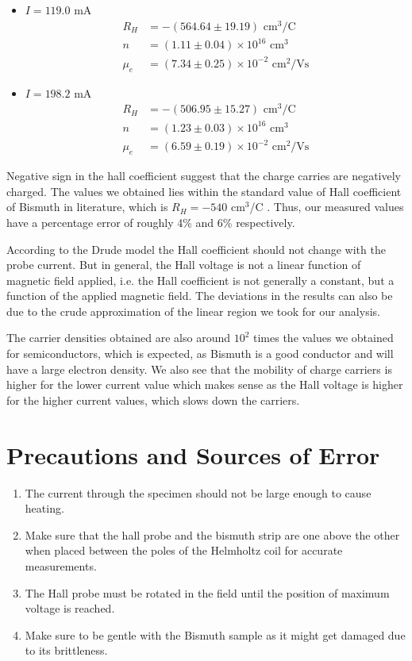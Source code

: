 \begin{itemize}
    \item $I=119.0$ mA
    \begin{align*}
        R_H &= - (564.64 \pm 19.19) \text{ cm}^3/\text{C}\\
        n &= (1.11 \pm 0.04) \times 10^{16} \text{ cm}^3\\
        \mu_e &= (7.34 \pm 0.25) \times 10^{-2} \text{ cm}^2/\text{Vs}
    \end{align*}
    \item $I=198.2$ mA
    \begin{align*}
        R_H &= - (506.95 \pm 15.27) \text{ cm}^3/\text{C}\\
        n &= (1.23 \pm 0.03) \times 10^{16} \text{ cm}^3\\
        \mu_e &= (6.59 \pm 0.19) \times 10^{-2} \text{ cm}^2/\text{Vs}
    \end{align*}
\end{itemize}

Negative sign in the hall coefficient suggest that the charge carries are negatively charged. The values we obtained lies within the standard value of Hall coefficient of Bismuth in literature, which is $R_H = -540 $ cm$^3$/C \cite{Kittel_2004,smat2017}. Thus, our measured values have a percentage error of roughly 4\% and 6\% respectively. 

According to the Drude model the Hall coefficient should not
change with the probe current. But in general, the
Hall voltage is not a linear function of magnetic field applied, i.e.
the Hall coefficient is not generally a constant, but a function of the applied magnetic field. The deviations in the results can also be due to the crude approximation of the linear region we took for our analysis.

The carrier densities obtained are also around $10^2$ times the values we obtained for semiconductors, which is expected, as Bismuth is a good conductor and will have a large electron density.
We also see that the mobility of charge carriers is higher for the
lower current value which makes sense as the Hall voltage is higher for the higher current values, which slows down the carriers. \vspace{-1em}

\section{Precautions and Sources of Error}

    \begin{enumerate}
        \item The current through the specimen should not be
        large enough to cause heating.
        \item Make sure that the hall probe and the bismuth strip
        are one above the other when placed between the
        poles of the Helmholtz coil for accurate measurements.
        \item The Hall probe must be rotated in the field until
        the position of maximum voltage is reached.
        \item Make sure to be gentle with the Bismuth sample as
        it might get damaged due to its brittleness.
    \end{enumerate}
